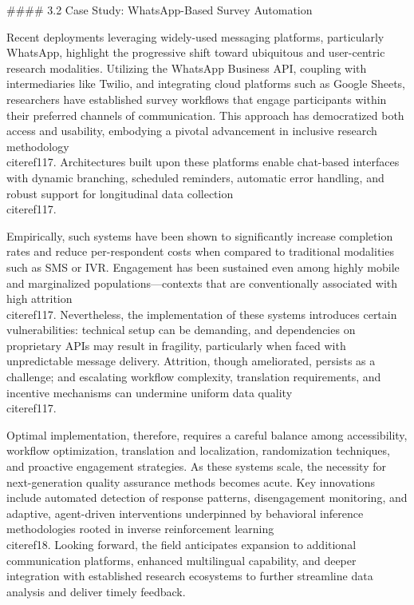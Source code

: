 \documentclass[11pt]{article}
\begin{document}
#### 3.2 Case Study: WhatsApp-Based Survey Automation

Recent deployments leveraging widely-used messaging platforms, particularly WhatsApp, highlight the progressive shift toward ubiquitous and user-centric research modalities. Utilizing the WhatsApp Business API, coupling with intermediaries like Twilio, and integrating cloud platforms such as Google Sheets, researchers have established survey workflows that engage participants within their preferred channels of communication. This approach has democratized both access and usability, embodying a pivotal advancement in inclusive research methodology~\\cite{ref117}. Architectures built upon these platforms enable chat-based interfaces with dynamic branching, scheduled reminders, automatic error handling, and robust support for longitudinal data collection~\\cite{ref117}.

Empirically, such systems have been shown to significantly increase completion rates and reduce per-respondent costs when compared to traditional modalities such as SMS or IVR. Engagement has been sustained even among highly mobile and marginalized populations—contexts that are conventionally associated with high attrition~\\cite{ref117}. Nevertheless, the implementation of these systems introduces certain vulnerabilities: technical setup can be demanding, and dependencies on proprietary APIs may result in fragility, particularly when faced with unpredictable message delivery. Attrition, though ameliorated, persists as a challenge; and escalating workflow complexity, translation requirements, and incentive mechanisms can undermine uniform data quality~\\cite{ref117}.

Optimal implementation, therefore, requires a careful balance among accessibility, workflow optimization, translation and localization, randomization techniques, and proactive engagement strategies. As these systems scale, the necessity for next-generation quality assurance methods becomes acute. Key innovations include automated detection of response patterns, disengagement monitoring, and adaptive, agent-driven interventions underpinned by behavioral inference methodologies rooted in inverse reinforcement learning~\\cite{ref18}. Looking forward, the field anticipates expansion to additional communication platforms, enhanced multilingual capability, and deeper integration with established research ecosystems to further streamline data analysis and deliver timely feedback.
\end{document}
